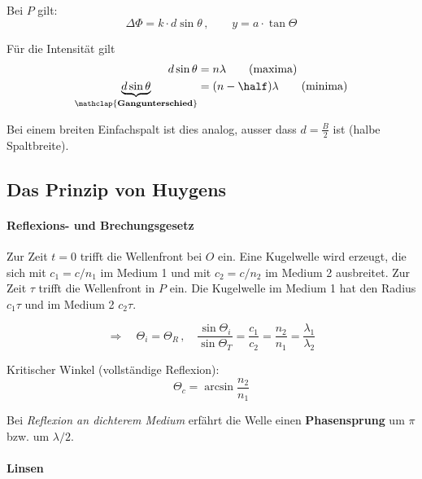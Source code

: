 		Bei $P$ gilt:
		\[
			\Delta \Phi = k\cdot d \sin \theta\,, \qquad y = a \cdot \tan \Theta
		\]
		
		Für die Intensität gilt
		\begin{align*}
			d \sin \theta &= n\lambda \tag{maxima} \\
			\underbrace{d \sin \theta}_{\mathclap{\text{\textbf{Gangunterschied}}}} &= (n - \half) \lambda \tag{minima}
		\end{align*}

		Bei einem breiten Einfachspalt ist dies analog, ausser dass $d = \frac B 2$
		ist (halbe Spaltbreite).
	\subsection{Das Prinzip von Huygens} %
		\paragraph{Reflexions- und Brechungsgesetz} %
			\begin{center}
				
			\end{center}
			
			Zur Zeit $t=0$ trifft die Wellenfront bei $O$ ein. Eine Kugelwelle wird erzeugt, die
			sich mit $c_1 = c/n_1$ im Medium 1 und mit $c_2 = c/n_2$ im Medium 2 ausbreitet.
			Zur Zeit $\tau$ trifft die Wellenfront in $P$ ein. Die Kugelwelle im Medium 1 hat den Radius $c_1 \tau$ und im Medium 2 $c_2 \tau$.
			
			\[
				\Rightarrow \quad \Theta_i = \Theta_R \,,\quad
					\frac{\sin\Theta_i}{\sin\Theta_T} = \frac{c_1}{c_2}
					= \frac{n_2}{n_1} = \frac{\lambda_1}{\lambda_2}
			\]
			
			Kritischer Winkel (vollständige Reflexion):
			\[
				\Theta_c = \arcsin \frac{n_2}{n_1}
			\]

			Bei \emph{Reflexion an dichterem Medium} erfährt die Welle einen
			\textbf{Phasensprung} um $\pi$ bzw. um $\lambda/2$.
		\paragraph{Linsen} %
			\begin{center}
				\vspace{-1cm}
				
			\end{center}

